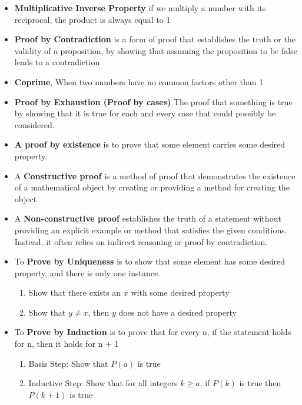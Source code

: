 \documentclass{report}
\begin{document}
\begin{itemize}
\begin{itemize}
            \item \textbf{Multiplicative Inverse Property} if we multiply a number with its reciprocal, the product is always equal to 1
            \item \textbf{Proof by Contradiction} is a form of proof that establishes the truth or the validity of a proposition, by showing that assuming the proposition to be false leads to a contradiction
            \item \textbf{Coprime}, When two numbers have no common factors other than 1
            \item \textbf{Proof by Exhaustion (Proof by cases)} The proof that something is true by showing that it is true for each and every case that could possibly be considered.
            \item     \textbf{A proof by existence} is to prove that some element carries some desired property. 
            \item A \textbf{Constructive proof}  is a method of proof that demonstrates the existence of a mathematical object by creating or providing a method for creating the object
            \item A \textbf{Non-constructive proof} establishes the truth of a statement without providing an explicit example or method that satisfies the given conditions. Instead, it often relies on indirect reasoning or proof by contradiction.
            \item      To \textbf{Prove by Uniqueness} is to show that some element has some desired property, and there is only one instance.
             \begin{enumerate}
                 \item Show that there exists an $x$ with some desired property
                \item Show that $y\ne x$, then $y $ does not have a desired property
             \end{enumerate}
           \item To \textbf{Prove by Induction} is to prove that for every n, if the statement holds for n, then it holds for n + 1 
            \begin{enumerate}
                \item Basis Step: Show that $P(a)$ is true
                \item Inductive Step: Show that for all integers $k \geq a$, if $P(k)$ is true then $P(k+1)$ is true
            \end{enumerate}
          \end{itemize}
      \end{itemize}
\end{document}
